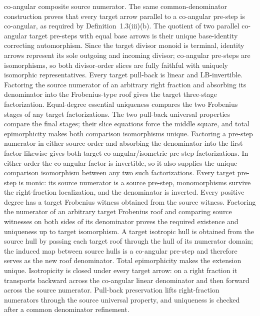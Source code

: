 \begin{definition}
  co-angular composite source numerator.
  The same common-denominator construction proves that every target arrow
  parallel to a co-angular pre-step is co-angular, as required by
  Definition~1.3(iii)(b).
  The quotient of two parallel co-angular target pre-steps with equal base
  arrows is their unique base-identity correcting automorphism.
  Since the target divisor monoid is terminal, identity arrows represent its
  sole outgoing and incoming divisor; co-angular pre-steps are isomorphisms,
  so both divisor-order slices are fully faithful with uniquely isomorphic
  representatives.
  Every target pull-back is linear and LB-invertible.  Factoring the source
  numerator of an arbitrary right fraction and absorbing its denominator into
  the Frobenius-type roof gives the target three-stage factorization.
  Equal-degree essential uniqueness compares the two Frobenius stages of any
  target factorizations.  The two pull-back universal properties compare the
  final stages; their slice equations force the middle square, and total
  epimorphicity makes both comparison isomorphisms unique.
  Factoring a pre-step numerator in either source order and absorbing the
  denominator into the first factor likewise gives both target
  co-angular/isometric pre-step factorizations.
  In either order the co-angular factor is invertible, so it also supplies the
  unique comparison isomorphism between any two such factorizations.
  Every target pre-step is monic: its source numerator is a source pre-step,
  monomorphisms survive the right-fraction localization, and the denominator
  is inverted.
  Every positive degree has a target Frobenius witness obtained from the
  source witness.  Factoring the numerator of an arbitrary target Frobenius
  roof and comparing source witnesses on both sides of its denominator proves
  the required existence and uniqueness up to target isomorphism.
  A target isotropic hull is obtained from the source hull by passing each
  target roof through the hull of its numerator domain; the induced map
  between source hulls is a co-angular pre-step and therefore serves as the
  new roof denominator.  Total epimorphicity makes the extension unique.
  Isotropicity is closed under every target arrow: on a right fraction it
  transports backward across the co-angular linear denominator and then
  forward across the source numerator.
  Pull-back preservation lifts right-fraction numerators through the source
  universal property, and uniqueness is checked after a common denominator
  refinement.


\end{definition}
